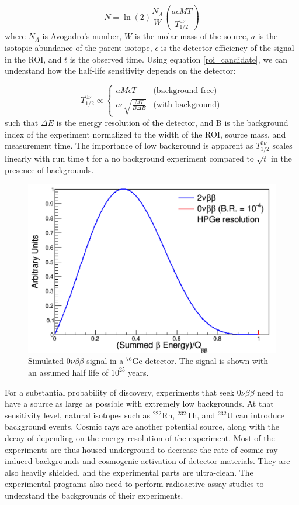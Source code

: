 \begin{equation}\label{roi_candidate}
N=\ln(2)\frac{N_A}{W}\left(\frac{a\epsilon MT}{T^{0\nu}_{1/2}}\right)
\end{equation}
where $N_A$ is Avogadro's number, $W$ is the molar mass of the source, $a$ is the isotopic abundance of the parent isotope, $\epsilon$ is the detector efficiency of the signal in the ROI, and $t$ is the observed time. Using equation \ref{roi_candidate}, we can understand how the half-life sensitivity depends on the detector:

\begin{equation}\label{det_sensitivity}
T^{0\nu}_{1/2} \propto
    \begin{cases}
    aM\epsilon T & \text{(background free)}\\
    a\epsilon\sqrt{\frac{MT}{B\Delta E}} & \text{(with background)}
    \end{cases}       
\end{equation}
such that $\Delta E$ is the energy resolution of the detector, and B is the background index of the experiment normalized to the width of the ROI, source mass, and measurement time. The importance of low background is apparent as $T^{0\nu}_{1/2}$ scales linearly with run time t for a no background experiment compared to $\sqrt{t}$ in the presence of backgrounds.


\begin{figure}[!htb]
\centering
\includegraphics[width=0.8\linewidth]{ch1/figs/DoubleBetaEnergy.png}
\caption{Simulated $0\nu\beta\beta$ signal in a ${}^{76}\mathrm{Ge}$ detector. The {\onbb} signal is shown with an assumed half life of $10^{25}$ \cite{mjd_background} years.}
\label{mjd_background_fig}
\end{figure}

For a substantial probability of discovery, experiments that seek $0\nu\beta\beta$ need to have a source as large as possible with extremely low backgrounds. At that sensitivity level, natural isotopes such as $^{222}$Rn, $^{232}$Th, and $^{232}$U can introduce background events. Cosmic rays are another potential source, along with the decay of {\tnbb} depending on the energy resolution of the experiment. Most of the experiments are thus housed underground to decrease the rate of cosmic-ray-induced backgrounds and cosmogenic activation of detector materials. They are also heavily shielded, and the experimental parts are ultra-clean. The experimental programs also need to perform radioactive assay studies to understand the backgrounds of their experiments.

